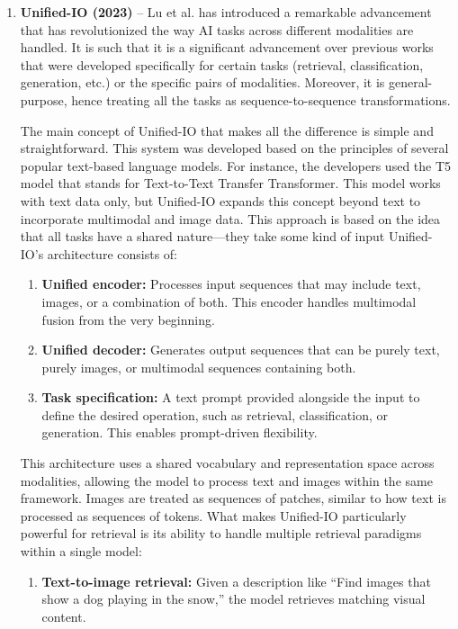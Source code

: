 \documentclass[conference]{IEEEtran}
\begin{document}
\begin{enumerate}
\item \textbf{Unified-IO (2023)} – Lu et al. \cite{lu2023unified} has introduced a remarkable advancement that has revolutionized the way AI tasks across different modalities are handled. It is such that it is a significant advancement over previous works that were developed specifically for certain tasks (retrieval, classification, generation, etc.) or the specific pairs of modalities. Moreover, it is general-purpose, hence treating all the tasks as sequence-to-sequence transformations.

The main concept of Unified-IO that makes all the difference is simple and straightforward. This system was developed based on the principles of several popular text-based language models. For instance, the developers used the T5 model that stands for Text-to-Text Transfer Transformer. This model works with text data only, but Unified-IO expands this concept beyond text to incorporate multimodal and image data. This approach is based on the idea that all tasks have a shared nature—they take some kind of input
Unified-IO's architecture consists of:

\begin{enumerate}
    \item \textbf{Unified encoder:} Processes input sequences that may include text, images, or a combination of both. This encoder handles multimodal fusion from the very beginning.
    
    \item \textbf{Unified decoder:} Generates output sequences that can be purely text, purely images, or multimodal sequences containing both.
    
    \item \textbf{Task specification:} A text prompt provided alongside the input to define the desired operation, such as retrieval, classification, or generation. This enables prompt-driven flexibility.
\end{enumerate}

This architecture uses a shared vocabulary and representation space across modalities, allowing the model to process text and images within the same framework. Images are treated as sequences of patches, similar to how text is processed as sequences of tokens.
What makes Unified-IO particularly powerful for retrieval is its ability to handle multiple retrieval paradigms within a single model:

\begin{enumerate}
    \item \textbf{Text-to-image retrieval:} Given a description like “Find images that show a dog playing in the snow,” the model retrieves matching visual content.
    

\end{enumerate}
\end{enumerate}
\end{document}
